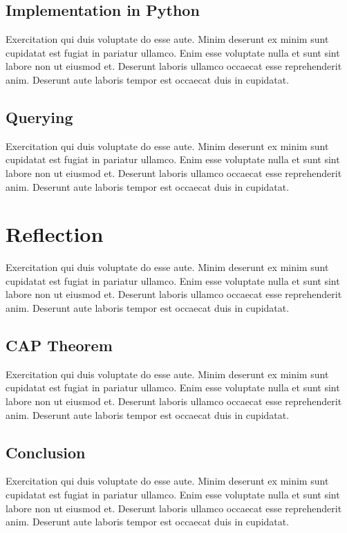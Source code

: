 \subsection{Implementation in Python} \label{subsec:implementationPythonNeo4j}

Exercitation qui duis voluptate do esse aute. Minim deserunt ex minim sunt cupidatat est fugiat in pariatur ullamco. Enim esse voluptate nulla et sunt sint labore non ut eiusmod et. Deserunt laboris ullamco occaecat esse reprehenderit anim. Deserunt aute laboris tempor est occaecat duis in cupidatat.

\subsection{Querying} \label{subsec:queryingNeo4j}

Exercitation qui duis voluptate do esse aute. Minim deserunt ex minim sunt cupidatat est fugiat in pariatur ullamco. Enim esse voluptate nulla et sunt sint labore non ut eiusmod et. Deserunt laboris ullamco occaecat esse reprehenderit anim. Deserunt aute laboris tempor est occaecat duis in cupidatat.

\section{Reflection} \label{sec:reflectionNeo4j}

Exercitation qui duis voluptate do esse aute. Minim deserunt ex minim sunt cupidatat est fugiat in pariatur ullamco. Enim esse voluptate nulla et sunt sint labore non ut eiusmod et. Deserunt laboris ullamco occaecat esse reprehenderit anim. Deserunt aute laboris tempor est occaecat duis in cupidatat.

\subsection{CAP Theorem} \label{subsec:capTheoremNeo4j}

Exercitation qui duis voluptate do esse aute. Minim deserunt ex minim sunt cupidatat est fugiat in pariatur ullamco. Enim esse voluptate nulla et sunt sint labore non ut eiusmod et. Deserunt laboris ullamco occaecat esse reprehenderit anim. Deserunt aute laboris tempor est occaecat duis in cupidatat.

\subsection{Conclusion} \label{subsec:conclusionNeo4j}

Exercitation qui duis voluptate do esse aute. Minim deserunt ex minim sunt cupidatat est fugiat in pariatur ullamco. Enim esse voluptate nulla et sunt sint labore non ut eiusmod et. Deserunt laboris ullamco occaecat esse reprehenderit anim. Deserunt aute laboris tempor est occaecat duis in cupidatat.
